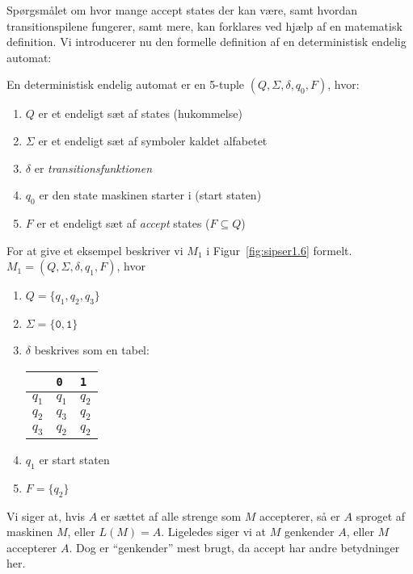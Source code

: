 Spørgsmålet om hvor mange accept states der kan være, samt hvordan transitionspilene fungerer, samt mere, kan forklares ved hjælp af en matematisk definition. Vi introducerer nu den formelle definition af en deterministisk endelig automat:

\begin{definition}
  En deterministisk endelig automat er en 5-tuple $(Q, \Sigma, \delta, q_{0}, F)$, hvor:
  \begin{enumerate}
    \item $Q$ er et endeligt sæt af states (hukommelse)
    \item $\Sigma$ er et endeligt sæt af symboler kaldet alfabetet
    \item $\delta$ er \textit{transitionsfunktionen}
    \item $q_{0}$ er den state maskinen starter i (start staten)
    \item $F$ er et endeligt sæt af \textit{accept} states ($F \subseteq Q$)
  \end{enumerate}
\end{definition}

For at give et eksempel beskriver vi $M_{1}$ i Figur~\ref{fig:sipser1.6} formelt.\\
$M_{1} = (Q, \Sigma, \delta, q_{1}, F)$, hvor
\begin{enumerate}
  \item $Q = \{q_{1}, q_{2}, q_{3}\}$
  \item $\Sigma = \{\mathtt{0,1}\}$
        \item $\delta$ beskrives som en tabel:
\begin{table}[h]
\centering
\begin{tabular}{l|ll}
      & \texttt{0} & \texttt{1} \\ \hline
$q_1$ & $q_1$      & $q_2$      \\
$q_2$ & $q_3$      & $q_2$      \\
$q_3$ & $q_2$      & $q_2$
\end{tabular}
\end{table}
  \item $q_{1}$ er start staten
        \item $F = \{q_{2}\}$
\end{enumerate}

Vi siger at, hvis $A$ er sættet af alle strenge som $M$ accepterer, så er $A$ sproget af maskinen $M$, eller $L(M) = A$. Ligeledes siger vi at $M$ genkender $A$, eller $M$ accepterer $A$. Dog er ``genkender'' mest brugt, da accept har andre betydninger her.

